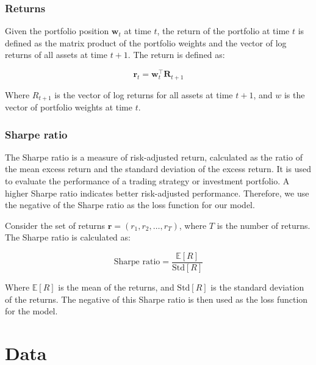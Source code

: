 \documentclass[12pt]{article}
\begin{document}
\subsubsection*{Returns}

Given the portfolio position $\mathbf{w}_t$ at time $t$, the return of the portfolio at time $t$ is defined as the matrix product of the portfolio weights and the vector of log returns of all assets at time $t+1$. The return is defined as:

\begin{equation}
    \mathbf{r}_t = \mathbf{w}_t^\top \mathbf{R}_{t+1}
    \label{eq:returns}
\end{equation}

\noindent
Where $R_{t+1}$ is the vector of log returns for all assets at time $t+1$, and $w$ is the vector of portfolio weights at time $t$. 

\subsubsection*{Sharpe ratio}

The Sharpe ratio is a measure of risk-adjusted return, calculated as the ratio of the mean excess return and the standard deviation of the excess return. It is used to evaluate the performance of a trading strategy or investment portfolio. A higher Sharpe ratio indicates better risk-adjusted performance. Therefore, we use the negative of the Sharpe ratio as the loss function for our model. 

Consider the set of returns $\mathbf{r} = (r_1, r_2, \ldots, r_T)$, where $T$ is the number of returns. The Sharpe ratio is calculated as:

\begin{equation}
    \text{Sharpe ratio} = \frac{\mathbb{E}[R]}{\text{Std}[R]}    
    \label{eq:sharpe_ratio}
\end{equation}

Where $\mathbb{E}[R]$ is the mean of the returns, and $\text{Std}[R]$ is the standard deviation of the returns. The negative of this Sharpe ratio is then used as the loss function for the model.

\clearpage






\section{Data}
\end{document}

